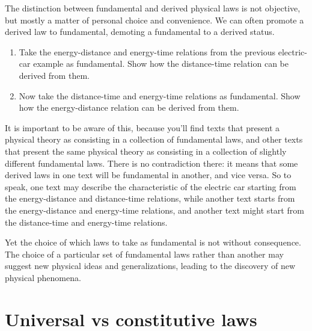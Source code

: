 \documentclass[a4paper,12pt,%
onecolumn,oneside,%
british%
]{memoir}
\renewcommand*{\|}[1][]{\nonscript\:#1\vert\nonscript\:\mathopen{}}
\begin{document}
The distinction between fundamental and derived physical laws is not objective, but mostly a matter of personal choice and convenience. We can often promote a derived law to fundamental, demoting a fundamental to a derived status.
\begin{exercise}
  \begin{enumerate}[exerc]
  \item Take the energy-distance and energy-time relations from the previous electric-car example as fundamental. Show how the distance-time relation can be derived from them.
  \item Now take the distance-time and energy-time relations as fundamental. Show how the energy-distance relation can be derived from them.
  \end{enumerate}
\end{exercise}
It is important to be aware of this, because you'll find texts that present a physical theory as consisting in a collection of fundamental laws, and other texts that present the same physical theory as consisting in a collection of slightly different fundamental laws. There is no contradiction there: it means that some derived laws in one text will be fundamental in another, and vice versa. So to speak, one text may describe the characteristic of the electric car starting from the energy-distance and distance-time relations, while another text starts from the energy-distance and energy-time relations, and another text might start from the distance-time and energy-time relations.

Yet the choice of which laws to take as fundamental is not without consequence. The choice of a particular set of fundamental laws rather than another may suggest new physical ideas and generalizations, leading to the discovery of new physical phenomena.


\section{Universal vs constitutive laws}
\label{sec:universal_constitutive}
\end{document}
